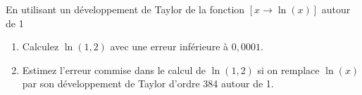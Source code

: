 
\begin{exercice}\label{exoDevel0003}

En utilisant un développement de Taylor de la fonction $[x \rightarrow
\ln(x)]$ autour de 1
\begin{enumerate}
\item
Calculez $\ln(1,2)$ avec une erreur inférieure à $0,0001$.
\item
Estimez l'erreur commise dans le calcul de $\ln(1,2)$ si on remplace
$\ln(x)$ par son développement de Taylor d'ordre 384 autour de 1.
\end{enumerate}


\end{exercice}
